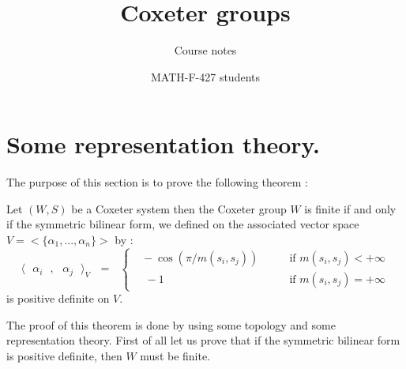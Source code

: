 \documentclass[envcountsame,envcountchap]{svmono}
\newcommand{\prods}[2]{\langle\qq #1\qq,\qq#2\qq\rangle}
\newcommand{\q}{\quad}
\newcommand{\qq}{\text{ }}
\begin{document}
\author{MATH-F-427 students}
\title{Coxeter groups}
\subtitle{Course notes}
\maketitle

\frontmatter%

\tableofcontents


\mainmatter%
\section{Some representation theory.}
The purpose of this section is to prove the following theorem :
\begin{theorem}\label{Le theorem W fini si et seulement si on  aun produit scalaire}
	Let $(W,S)$ be a Coxeter system then the Coxeter group $W$ is finite if and only if the symmetric bilinear form, we defined on the associated vector space  $V=<\{\alpha_1,...,\alpha_n\}>$ by :
	\begin{equation}
	\prods{\alpha_i}{\alpha_j}_V\qq=\qq \begin{cases}
	\qq -\cos(\pi/m(s_i,s_j))\q\q&\mbox{if }m(s_i,s_j)<+\infty\\
	\q -1&\mbox{if }m(s_i,s_j)=+\infty
	\end{cases}
	\end{equation}
	is positive definite on $V$.
\end{theorem}
The proof of this theorem is done by using some topology and some representation theory. First of all let us prove that if the symmetric bilinear form is positive definite, then $W$ must be finite.
\end{document}
